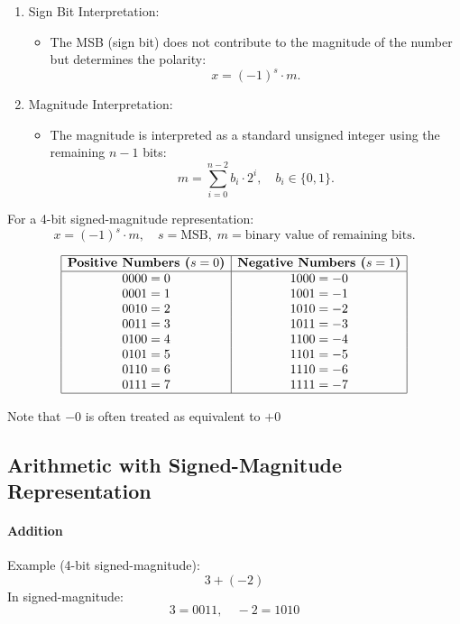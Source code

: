 \begin{enumerate}[left=1cm]
    \item Sign Bit Interpretation:
    \begin{itemize}
        \item The MSB (sign bit) does not contribute to the magnitude of the number but determines the polarity:
        \[
        x = (-1)^s \cdot m.
        \]
    \end{itemize}

    \item Magnitude Interpretation:
    \begin{itemize}
        \item The magnitude is interpreted as a standard unsigned integer using the remaining \( n-1 \) bits:
        \[
            m = \sum_{i=0}^{n-2} b_i \cdot 2^i, \quad b_i \in \{0, 1\}.
        \]
    \end{itemize}
\end{enumerate}


For a 4-bit signed-magnitude representation:
\[
x = (-1)^s \cdot m, \quad s = \text{MSB}, \; m = \text{binary value of remaining bits}.
\]

\[
\begin{array}{|c|c|}
\hline
\textbf{Positive Numbers (\( s = 0 \))} & \textbf{Negative Numbers (\( s = 1 \))} \\
\hline
0000 = 0 & 1000 = -0 \\
0001 = 1 & 1001 = -1 \\
0010 = 2 & 1010 = -2 \\
0011 = 3 & 1011 = -3 \\
0100 = 4 & 1100 = -4 \\
0101 = 5 & 1101 = -5 \\
0110 = 6 & 1110 = -6 \\
0111 = 7 & 1111 = -7 \\
\hline
\end{array}
\]

Note that $-0$ is often treated as equivalent to \( +0 \)



\subsection{Arithmetic with Signed-Magnitude Representation}
\paragraph{Addition} Example (4-bit signed-magnitude):
\[
3 + (-2)
\]
In signed-magnitude:
\[
3 = 0011, \quad -2 = 1010
\]

